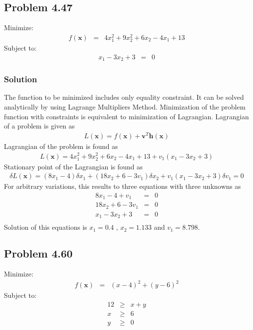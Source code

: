 \documentclass[]{report}
\begin{document}
\subsection*{Problem 4.47}
Minimize:
\begin{eqnarray*}
f\left(\mathbf x\right) &=& 4 x_1^2+9x_2^2+6x_2-4x_1+13
\end{eqnarray*} 
Subject to:
\begin{eqnarray*}
x_1-3x_2+3&=& 0
\end{eqnarray*} 
\subsubsection*{Solution}
The function to be minimized includes only equality constraint. It can be solved analytically by using Lagrange Multipliers Method. Minimization of the problem function with constraints is equivalent to minimization of Lagrangian. Lagrangian of a problem is given as
\begin{eqnarray*}
L\left(\mathbf{x}\right)=f\left(\mathbf{x}\right)+\mathbf{v}^T \mathbf{h}\left(\mathbf x\right)
\end{eqnarray*}
Lagrangian of the problem is found as
\begin{eqnarray*}
L\left(\mathbf{x}\right)=4 x_1^2+9x_2^2+6x_2-4x_1+13+v_1\left(x_1-3x_2+3\right)
\end{eqnarray*}
Stationary point of the Lagrangian is found as
\begin{eqnarray*}
\delta L\left(\mathbf{x}\right)=\left(8 x_1-4\right)\delta x_1+\left(18x_2+6-3v_1\right)\delta x_2+v_1\left(x_1-3x_2+3\right)\delta v_1=0
\end{eqnarray*}
For arbitrary variations, this results to three equations with three unknowns as
\begin{eqnarray*}
8x_1-4+v_1&=& 0\\
18x_2+6-3v_1&=& 0\\
x_1-3x_2+3&=& 0\\
\end{eqnarray*}
Solution of this equations is $x_1=0.4$ , $x_2=1.133$ and $v_1=8.798$.
\subsection*{Problem 4.60}
Minimize:
\begin{eqnarray*}
f\left(\mathbf x\right) &=& \left(x-4\right)^2+\left(y-6\right)^2
\end{eqnarray*} 
Subject to:
\begin{eqnarray*}
12 &\geq& x+y \\
x &\geq& 6  \\
y &\geq& 0
\end{eqnarray*} 
\end{document}
